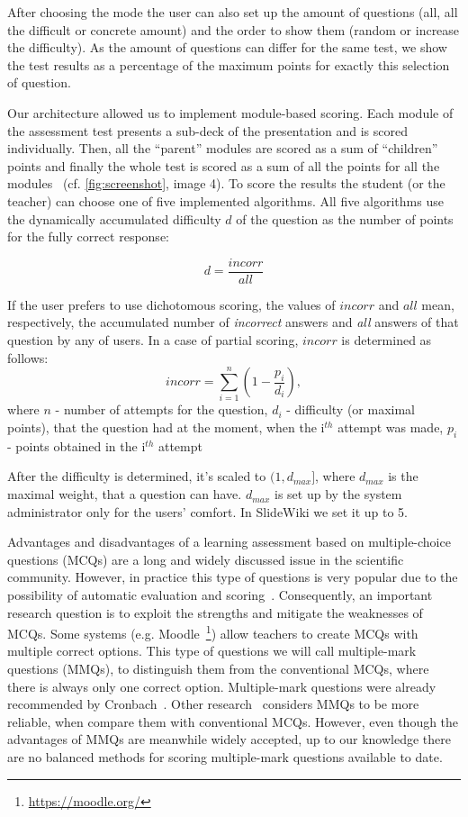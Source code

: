 \documentclass[ngerman,UKenglish,table]{scrbook}
\begin{document}
After choosing the mode the user can also set up the amount of questions (all, all the difficult or concrete amount) and the order to show them (random or increase the difficulty).
As the amount of questions can differ for the same test, we show the test results as a percentage of the maximum points for exactly this selection of question.

Our architecture allowed us to implement module-based scoring.
Each module of the assessment test presents a sub-deck of the presentation and is scored individually.
Then, all the ``parent'' modules are scored as a sum of ``children'' points and finally the whole test is scored as a sum of all the points for all the modules ~(cf. \autoref{fig:screenshot}, image 4).
To score the results the student (or the teacher) can choose one of five implemented algorithms.
All five algorithms use the dynamically accumulated difficulty $d$ of the question as the number of points for the fully correct response:

\begin{equation}
d = \frac{incorr}{all}
\end{equation}

If the user prefers to use dichotomous scoring, the values of $incorr$ and $all$ mean, respectively, the accumulated number of \textit{incorrect} answers and \textit{all} answers of that question by any of users.
In a case of partial scoring, $incorr$ is determined as follows:
\begin{equation}
incorr = \sum \limits_{i=1}^n(1 - \frac{p_{i}}{d_{i}}) ,
\end{equation}
where $n$ - number of attempts for the question,
$d_{i}$ - difficulty (or maximal points), that the question had at the moment, when the i$ ^{th}$ attempt was made, $p_{i}$ - points obtained in the i$ ^{th}$ attempt

After the difficulty is determined, it's scaled to $(1,d_{max}]$, where $d_{max}$ is the maximal weight, that a question can have.
$d_{max}$ is set up by the system administrator only for the users' comfort.
In SlideWiki we set it up to 5.

Advantages and disadvantages of a learning assessment based on multiple-choice questions (MCQs) are a long and widely discussed issue in the scientific community.
However, in practice this type of questions is very popular due to the possibility of automatic evaluation and scoring~\cite{Farthing1998}.
Consequently, an important research question is to exploit the strengths and mitigate the weaknesses of MCQs.
Some systems (e.g. Moodle~\footnote{\url{https://moodle.org/}}) allow teachers to create MCQs with multiple correct options.
This type of questions we will call multiple-mark questions (MMQs), to distinguish them from the conventional MCQs, where there is always only one correct option.
Multiple-mark questions were already recommended by Cronbach~\cite{Cronbach}.
Other research~\cite{Ripkey1996,Pomplun1997,Hohensinn2011} considers MMQs to be more reliable, when compare them with conventional MCQs.
However, even though the advantages of MMQs are meanwhile widely accepted, up to our knowledge there are no balanced methods for scoring multiple-mark questions available to date.
\end{document}

